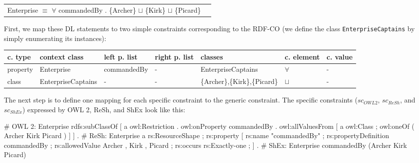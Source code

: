 \documentclass{llncs}
\newcommand{\ms}[1]{\texttt{#1}}
\newenvironment{gcotable}{
  \scriptsize
  \sffamily
  \vspace{0.3cm}
	\begin{center}
  \begin{tabular}{l|l|l|l|l|l|l}
  \hline
  \textbf{c. type} & \textbf{context class} & \textbf{left p. list} & \textbf{right p. list} & \textbf{classes} & \textbf{c. element} & \textbf{c. value} \\
  \hline

}{
  \hline
  \end{tabular}
	\end{center}
}
\newenvironment{DL}{
  \vspace{0.3cm}
	\begin{center}
  \begin{tabular}{r l}

}{
  \end{tabular}
	\end{center}
}
\begin{document}

\begin{DL}
Enterprise $\equiv$ $\forall$ commandedBy . \{Archer\} $\sqcup$ \{Kirk\} $\sqcup$ \{Picard\}
\end{DL}

First, we map these DL statements to two simple constraints corresponding to the RDF-CO (we define the class \ms{EnterpriseCaptains} by simply enumerating its instances):


\begin{gcotable}
property & Enterprise & commandedBy & - & EnterpriseCaptains & $\forall$ & - \\
class & EnterpriseCaptains & - & - & \{Archer\},\{Kirk\},\{Picard\} & $\sqcup$ & - \\
\end{gcotable}

The next step is to define one mapping for each specific constraint to the generic constraint.
The specific constraints (\ms{$sc_{OWL 2}$}, \ms{$sc_{ReSh}$}, and \ms{$sc_{ShEx}$}) expressed by OWL 2, ReSh, and ShEx look like this:

\begin{ex}
# OWL 2:
Enterprise rdfs:subClassOf [ a owl:Restriction .
    owl:onProperty commandedBy .
    owl:allValuesFrom [ a owl:Class ;
        owl:oneOf ( Archer Kirk Picard ) ] ] .
# ReSh:
Enterprise a rs:ResourceShape ; rs:property [
    rs:name "commandedBy" ; rs:propertyDefinition commandedBy ;
    rs:allowedValue Archer , Kirk , Picard ;
    rs:occurs rs:Exactly-one ; ] .
# ShEx:
Enterprise {
    commandedBy (Archer Kirk Picard) }
\end{ex}
\end{document}
